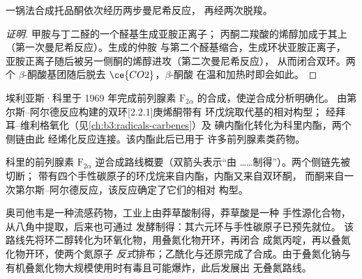\begin{proposition}[一锅法合成托品酮]\label{prop:b3:total-synthesis:tropinone}
一锅法合成托品酮依次经历两步曼尼希反应，
再经两次脱羧。
\end{proposition}

\begin{proof}[证明]
甲胺与丁二醛的一个醛基生成亚胺正离子；
丙酮二羧酸的烯醇加成于其上（第一次曼尼希反应）。生成的仲胺
与第二个醛基缩合，生成环状亚胺正离子，
亚胺正离子随后被另一侧酮的烯醇进攻（第二次曼尼希反应），
从而闭合双环。两个 $\beta$-酮酸基团随后脱去 $\ce{CO2}$，$\beta$-酮酸
在温和加热时即会如此。
\end{proof}

埃利亚斯·科里于 1969 年完成前列腺素 $\mathrm F_{2\alpha}$ 的合成，使逆合成分析明确化。
由第尔斯–阿尔德反应构建的双环[2.2.1]庚烯酮带有
环戊烷取代基的相对构型；
经拜耳–维利格氧化（见\cref{ch:b3:radicals-carbenes}）及
碘内酯化转化为科里内酯，两个侧链由此
经烯化反应连接。该内酯此后已用于
许多前列腺素类药物。

\begin{omfigure}

{\small 科里的前列腺素 $\mathrm F_{2\alpha}$ 逆合成路线概要（双箭头表示“由
……制得”）。两个侧链先被切断；
带有四个手性碳原子的环戊烷来自内酯，内酯又来自双环酮，
而酮来自一次第尔斯–阿尔德反应，该反应确定了它们的相对
构型。}
\end{omfigure}

奥司他韦是一种流感药物，工业上由莽草酸制得，莽草酸是一种
手性源化合物，从八角中提取，后来也可通过
发酵制得：其六元环与手性碳原子已预先就位。
该路线先将环二醇转化为环氧化物，用叠氮化物开环，再闭合
成氮丙啶，再以叠氮化物开环，使两个氮原子
\textit{反式}排布；乙酰化与还原完成了合成。由于叠氮化钠与
有机叠氮化物大规模使用时有毒且可能爆炸，此后发展出
无叠氮路线。

